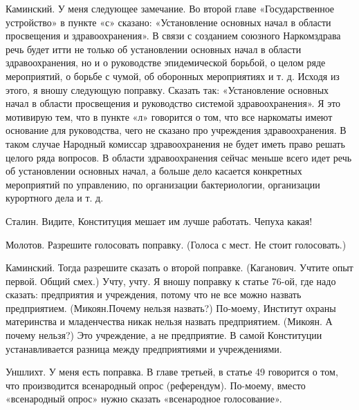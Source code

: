 \documentclass{kursa4}
\begin{document}
  \textcolor[rgb]{0.70980394,0.1764706,0.13725491}{Каминский.}{
  У меня следующее замечание. Во второй главе «Государственное
  устройство» в пункте «с» сказано: «Установление основных начал в
  области просвещения и здравоохранения». В связи с созданием союзного
  Наркомздрава речь будет итти не только об установлении основных начал в
  области здравоохранения, но и о руководстве эпидемической борьбой, о
  целом ряде мероприятий, о борьбе с чумой, об оборонных мероприятиях и
  т. д. Исходя из этого, я вношу следующую поправку. Сказать так:
  «Установление основных начал в области просвещения и руководство
  системой здравоохранения». Я это мотивирую тем, что в пункте «л»
  говорится о том, что все наркоматы имеют основание для руководства,
  чего не сказано про учреждения здравоохранения. В таком случае Народный
  комиссар здравоохранения не будет иметь право решать целого ряда
  вопросов. В области здравоохранения сейчас меньше всего идет речь об
  установлении основных начал, а больше дело касается конкретных
  мероприятий по управлению, по организации бактериологии, организации
  курортного дела и т. д.}

  \textcolor[rgb]{0.70980394,0.1764706,0.13725491}{Сталин.}{
  Видите, Конституция мешает им лучше работать. Чепуха какая!}

  \textcolor[rgb]{0.70980394,0.1764706,0.13725491}{Молотов.}{
  Разрешите голосовать поправку.
  (}\textcolor[rgb]{0.70980394,0.1764706,0.13725491}{Голоса с
  мест.}{ Не стоит голосовать.)}

  \textcolor[rgb]{0.70980394,0.1764706,0.13725491}{Каминский.}{
  Тогда разрешите сказать о второй поправке.
  (}\textcolor[rgb]{0.70980394,0.1764706,0.13725491}{Каганович.}{
  Учтите опыт первой.
  }\textcolor[rgb]{0.70980394,0.1764706,0.13725491}{Общий
  смех.}{) Учту, учту. Я вношу поправку к статье 76-ой,
  где надо сказать: предприятия и учреждения, потому что не все можно
  назвать предприятием.
  (}\textcolor[rgb]{0.70980394,0.1764706,0.13725491}{Микоян.}{Почему
  нельзя назвать?) По-моему, Институт охраны материнства и младенчества
  никак нельзя назвать предприятием.
  (}\textcolor[rgb]{0.70980394,0.1764706,0.13725491}{Микоян.}{
  А почему нельзя?) Это учреждение, а не предприятие. В самой Конституции
  устанавливается разница между предприятиями и учреждениями.}

  \textcolor[rgb]{0.70980394,0.1764706,0.13725491}{Уншлихт.}{
  У меня есть поправка. В главе третьей, в статье 49 говорится о том, что
  производится всенародный опрос (референдум). По-моему, вместо
  «всенародный опрос» нужно сказать «всенародное голосование».}
\end{document}
